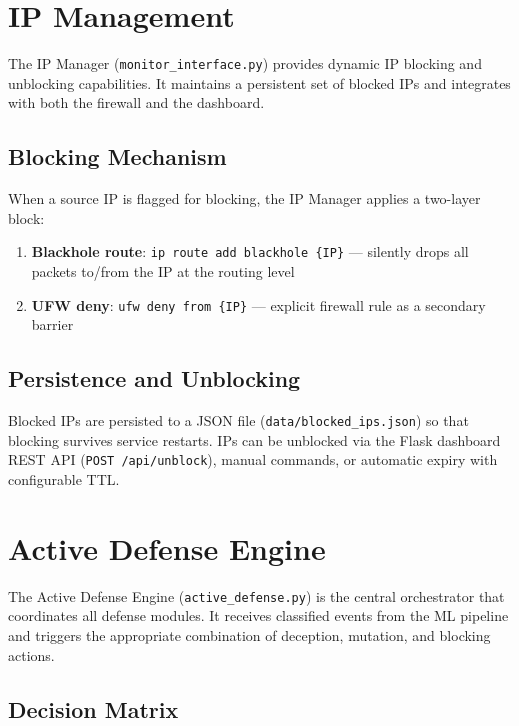 \section{IP Management}

The IP Manager (\texttt{monitor\_interface.py}) provides dynamic IP blocking and unblocking capabilities. It maintains a persistent set of blocked IPs and integrates with both the firewall and the dashboard.

\subsection{Blocking Mechanism}

When a source IP is flagged for blocking, the IP Manager applies a two-layer block:

\begin{enumerate}
    \item \textbf{Blackhole route}: \texttt{ip route add blackhole \{IP\}} --- silently drops all packets to/from the IP at the routing level
    \item \textbf{UFW deny}: \texttt{ufw deny from \{IP\}} --- explicit firewall rule as a secondary barrier
\end{enumerate}

\subsection{Persistence and Unblocking}

Blocked IPs are persisted to a JSON file (\texttt{data/blocked\_ips.json}) so that blocking survives service restarts. IPs can be unblocked via the Flask dashboard REST API (\texttt{POST /api/unblock}), manual commands, or automatic expiry with configurable TTL.

\section{Active Defense Engine}

The Active Defense Engine (\texttt{active\_defense.py}) is the central orchestrator that coordinates all defense modules. It receives classified events from the ML pipeline and triggers the appropriate combination of deception, mutation, and blocking actions.

\subsection{Decision Matrix}

